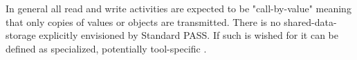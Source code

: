 In general all read and write activities are expected to be "call-by-value" meaning that only copies of values or objects are transmitted. There is no shared-data-storage explicitly envisioned by Standard PASS. If such is wished for it can be defined as specialized, potentially tool-specific .





